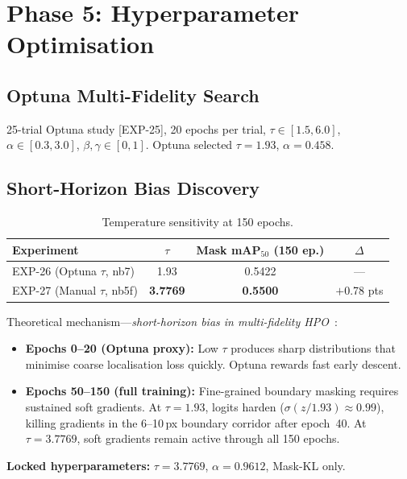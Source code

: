 \documentclass[12pt,a4paper]{article}
\begin{document}
\section{Phase 5: Hyperparameter Optimisation}
\label{sec:phase5}

\subsection{Optuna Multi-Fidelity Search}

25-trial Optuna study [EXP-25], 20 epochs per trial,
$\tau\in[1.5,6.0]$, $\alpha\in[0.3,3.0]$, $\beta,\gamma\in[0,1]$.
Optuna selected $\tau=1.93$, $\alpha=0.458$.

\subsection{Short-Horizon Bias Discovery}

\begin{table}[H]\centering
\caption{Temperature sensitivity at 150 epochs.}
\begin{tabular}{lccc}
\toprule
Experiment & $\tau$ & Mask mAP$_{50}$ (150 ep.) & $\Delta$ \\
\midrule
EXP-26 (Optuna $\tau$, nb7) & 1.93 & 0.5422 & --- \\
EXP-27 (Manual $\tau$, nb5f) & \textbf{3.7769} & \textbf{0.5500} & $+$0.78 pts \\
\bottomrule
\end{tabular}
\end{table}

Theoretical mechanism---\emph{short-horizon bias in multi-fidelity HPO}~\cite{falkner2018bohb}:
\begin{itemize}
  \item \textbf{Epochs 0--20 (Optuna proxy):} Low $\tau$ produces sharp
    distributions that minimise coarse localisation loss quickly.
    Optuna rewards fast early descent.
  \item \textbf{Epochs 50--150 (full training):} Fine-grained boundary masking
    requires sustained soft gradients.
    At $\tau=1.93$, logits harden ($\sigma(z/1.93)\approx0.99$), killing
    gradients in the 6--10\,px boundary corridor after epoch~40.
    At $\tau=3.7769$, soft gradients remain active through all 150 epochs.
\end{itemize}
\textbf{Locked hyperparameters:} $\tau=3.7769$, $\alpha=0.9612$, Mask-KL only.
\end{document}
